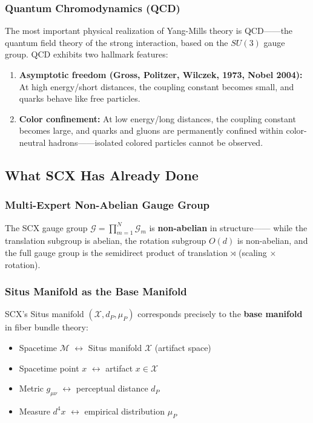 \documentclass[12pt,a4paper]{article}
\theoremstyle{remark}
\newcommand{\calG}{\mathcal{G}}
\begin{document}
\subsubsection{Quantum Chromodynamics (QCD)}

The most important physical realization of Yang-Mills theory is QCD——the quantum field theory of the strong interaction, based on the $SU(3)$ gauge group.
QCD exhibits two hallmark features:
\begin{enumerate}[label=(\arabic*)]
    \item \textbf{Asymptotic freedom (Gross, Politzer, Wilczek, 1973, Nobel 2004):}
    At high energy/short distances, the coupling constant becomes small, and quarks behave like free particles.
    \item \textbf{Color confinement:} At low energy/long distances, the coupling constant becomes large, and quarks and gluons are permanently confined within
    color-neutral hadrons——isolated colored particles cannot be observed.
\end{enumerate}

\subsection{What SCX Has Already Done}

\subsubsection{Multi-Expert Non-Abelian Gauge Group}

The SCX gauge group $\calG = \prod_{m=1}^N \calG_m$ is \textbf{non-abelian} in structure——
while the translation subgroup is abelian, the rotation subgroup $O(d)$ is non-abelian,
and the full gauge group is the semidirect product of translation $\rtimes$ (scaling $\times$ rotation).

\subsubsection{Situs Manifold as the Base Manifold}

SCX's Situs manifold $(\mathcal{X}, d_P, \mu_P)$ corresponds precisely to the \textbf{base manifold} in fiber bundle theory:
\begin{itemize}
    \item Spacetime $\mathcal{M}$ $\longleftrightarrow$ Situs manifold $\mathcal{X}$ (artifact space)
    \item Spacetime point $x$ $\longleftrightarrow$ artifact $x \in \mathcal{X}$
    \item Metric $g_{\mu\nu}$ $\longleftrightarrow$ perceptual distance $d_P$
    \item Measure $d^4x$ $\longleftrightarrow$ empirical distribution $\mu_P$
\end{itemize}
\end{document}
